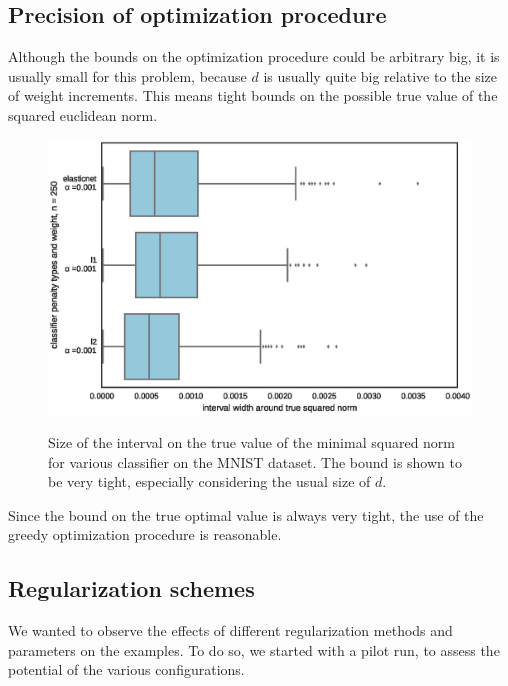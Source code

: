 \documentclass{article} %
\begin{document}
\subsection{Precision of optimization procedure}

Although the bounds on the optimization procedure could be arbitrary big, it
is usually small for this problem, because $d$ is usually quite big relative
to the size of weight increments. This means tight bounds on the possible
true value of the squared euclidean norm.

\begin{figure}[h!]
\begin{center}
\includegraphics[scale=0.65]{figs/experiment_1}
\label{res:exp1}
\caption{\small Size of the interval on the true value of the minimal squared norm for various
                classifier on the MNIST dataset. The bound is shown to be very tight, especially considering the usual size of $d$.}
\end{center}
\end{figure}

Since the bound on the true optimal value is always very tight, the use of
the greedy optimization procedure is reasonable.


\subsection{Regularization schemes}

We wanted to observe the effects of different regularization methods and parameters on the examples. To do so, we started with
a pilot run, to assess the potential of the various configurations.
\end{document}
